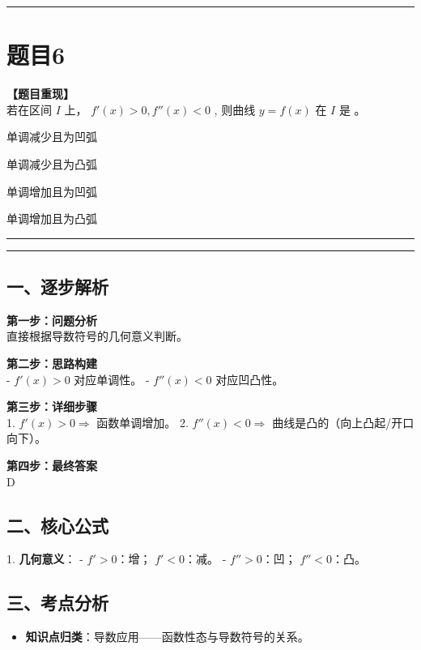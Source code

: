 \documentclass[12pt, a4paper]{ctexart}
\newcommand{\TopSeparator}{
    \par\noindent\rule{\textwidth}{1.5pt}\vspace{0.5em} %
}
\newcommand{\AnalysisSeparator}{
    \par\noindent\rule{\textwidth}{0.5pt}\vspace{0.2em}\hrule\vspace{0.5em} %
}
\newenvironment{RedAnalysis}{
    \par
    \color{red} %
}{
    \par
    \color{black} %
}
\newcommand{\choicesTwo}[4]{
    \begin{enumerate}[label=\Alph*., itemsep=0pt, parsep=0pt, topsep=5pt, labelsep=0.5em]
        \begin{minipage}{0.45\linewidth} \item #1 \end{minipage}
        \begin{minipage}{0.45\linewidth} \item #2 \end{minipage}
        \begin{minipage}{0.45\linewidth} \item #3 \end{minipage}
        \begin{minipage}{0.45\linewidth} \item #4 \end{minipage}
    \end{enumerate}
}
\begin{document}
\vspace{2em}

\TopSeparator
\section*{题目6}

\textbf{【题目重现】} \\
若在区间 $I$ 上， $ f'(x)>0, f''(x)<0 $ , 则曲线 $ y=f(x) $ 在 $I$ 是 \underline{\hspace{1cm}}。
\choicesTwo
{单调减少且为凹弧}
{单调减少且为凸弧}
{单调增加且为凹弧}
{单调增加且为凸弧}

\AnalysisSeparator

\begin{RedAnalysis}

\subsection*{一、逐步解析}

\textbf{第一步：问题分析} \\
直接根据导数符号的几何意义判断。

\textbf{第二步：思路构建} \\
- $f'(x) > 0$ 对应单调性。
- $f''(x) < 0$ 对应凹凸性。

\textbf{第三步：详细步骤} \\
1. $f'(x) > 0 \Rightarrow$ 函数单调增加。
2. $f''(x) < 0 \Rightarrow$ 曲线是凸的（向上凸起/开口向下）。

\textbf{第四步：最终答案} \\
D

\subsection*{二、核心公式}
1. \textbf{几何意义}：
   - $f' > 0$：增； $f' < 0$：减。
   - $f'' > 0$：凹； $f'' < 0$：凸。

\subsection*{三、考点分析}
\begin{itemize}
    \item \textbf{知识点归类}：导数应用——函数性态与导数符号的关系。
\end{itemize}

\end{RedAnalysis}

\vspace{2em}
\end{document}

